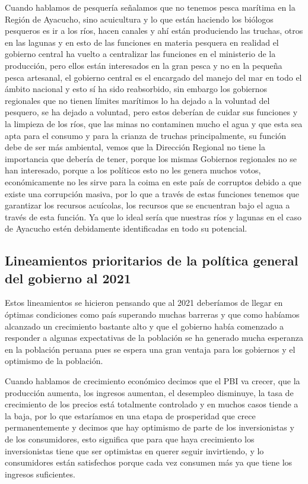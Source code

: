 \documentclass[
  a4paper,
]{article}
\begin{document}
Cuando hablamos de pesquería señalamos que no tenemos pesca marítima en
la Región de Ayacucho, sino acuicultura y lo que están haciendo los
biólogos pesqueros es ir a los ríos, hacen canales y ahí están
produciendo las truchas, otros en las lagunas y en esto de las funciones
en materia pesquera en realidad el gobierno central ha vuelto a
centralizar las funciones en el ministerio de la producción, pero ellos
están interesados en la gran pesca y no en la pequeña pesca artesanal,
el gobierno central es el encargado del manejo del mar en todo el ámbito
nacional y esto sí ha sido reabsorbido, sin embargo los gobiernos
regionales que no tienen límites marítimos lo ha dejado a la voluntad
del pesquero, se ha dejado a voluntad, pero estos deberían de cuidar sus
funciones y la limpieza de los ríos, que las minas no contaminen mucho
el agua y que esta sea apta para el consumo y para la crianza de truchas
principalmente, su función debe de ser más ambiental, vemos que la
Dirección Regional no tiene la importancia que debería de tener, porque
los mismas Gobiernos regionales no se han interesado, porque a los
políticos esto no les genera muchos votos, económicamente no les sirve
para la coima en este país de corruptos debido a que existe una
corrupción masiva, por lo que a través de estas funciones tenemos que
garantizar los recursos acuícolas, los recursos que se encuentran bajo
el agua a través de esta función. Ya que lo ideal sería que nuestras
ríos y lagunas en el caso de Ayacucho estén debidamente identificadas en
todo su potencial.

\subsection{Lineamientos prioritarios de la política general del
gobierno al
2021}\label{lineamientos-prioritarios-de-la-poluxedtica-general-del-gobierno-al-2021}

Estos lineamientos se hicieron pensando que al 2021 deberíamos de llegar
en óptimas condiciones como país superando muchas barreras y que como
habíamos alcanzado un crecimiento bastante alto y que el gobierno había
comenzado a responder a algunas expectativas de la población se ha
generado mucha esperanza en la población peruana pues se espera una gran
ventaja para los gobiernos y el optimismo de la población.

Cuando hablamos de crecimiento económico decimos que el PBI va crecer,
que la producción aumenta, los ingresos aumentan, el desempleo
disminuye, la tasa de crecimiento de los precios está totalmente
controlado y en muchos casos tiende a la baja, por lo que estaríamos en
una etapa de prosperidad que crece permanentemente y decimos que hay
optimismo de parte de los inversionistas y de los consumidores, esto
significa que para que haya crecimiento los inversionistas tiene que ser
optimistas en querer seguir invirtiendo, y lo consumidores están
satisfechos porque cada vez consumen más ya que tiene los ingresos
suficientes.
\end{document}
